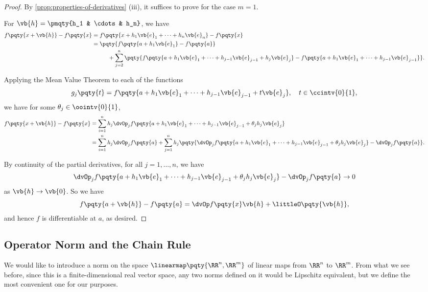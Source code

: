 \begin{proof}
    By \autoref{prop:properties-of-derivatives} (iii), it suffices to prove for the case \(m = 1\).

    For \(\vb{h} = \pmqty{h_1 & \cdots & h_n}\), we have
    \begin{align*}
        f\pqty{x + \vb{h}} - f\pqty{x} &= f\pqty{x + h_1 \vb{e}_1 + \cdots + h_n \vb{e}_n} - f\pqty{x} \\
        &= \pqty{f\pqty{a + h_1 \vb{e}_1} - f\pqty{a}} \\
        &\phantom{=} \qquad + \sum_{j = 2}^{n} \pqty{f\pqty{a + h_1 \vb{e}_1 + \cdots + h_{j - 1} \vb{e}_{j - 1} + h_j \vb{e}_j} - f\pqty{a + h_1 \vb{e}_1 + \cdots + h_{j - 1} \vb{e}_{j - 1}}}.
    \end{align*}

    Applying the Mean Value Theorem to each of the functions
    \[
        g_j\pqty{t} = f\pqty{a + h_1 \vb{e}_1 + \cdots + h_{j - 1} \vb{e}_{j - 1} + t \vb{e}_j}, \quad t \in \ccintv{0}{1},
    \]
    we have for some \(\theta_j \in \oointv{0}{1}\),
    \begin{align*}
        f\pqty{x + \vb{h}} - f\pqty{x} &= \sum_{i = 1}^{n} h_j \dvOp_j f\pqty{a + h_1 \vb{e}_1 + \cdots + h_{j - 1} \vb{e}_{j - 1} + \theta_j h_j \vb{e}_j} \\
        &= \sum_{i = 1}^{n} h_j \dvOp_j f\pqty{a} + \sum_{j = 1}^{n} h_j \pqty{\dvOp_j f\pqty{a + h_1 \vb{e}_1 + \cdots + h_{j - 1} \vb{e}_{j - 1} + \theta_j h_j \vb{e}_j} - \dvOp_j f\pqty{a}}.
    \end{align*}

    By continuity of the partial derivatives, for all \(j = 1, \ldots, n\), we have
    \[
        \dvOp_j f\pqty{a + h_1 \vb{e}_1 + \cdots + h_{j - 1} \vb{e}_{j - 1} + \theta_j h_j \vb{e}_j} - \dvOp_j f\pqty{a} \to 0
    \]
    as \(\vb{h} \to \vb{0}\). So we have
    \[
        f\pqty{a + \vb{h}} - f\pqty{a} = \dvOp f\pqty{x} \vb{h} + \littleO\pqty{\vb{h}},
    \]
    and hence \(f\) is differentiable at \(a\), as desired.
\end{proof}

\subsection{Operator Norm and the Chain Rule}

We would like to introduce a norm on the space \(\linearmap\pqty{\RR^n, \RR^m}\) of linear maps from \(\RR^n\) to \(\RR^m\). From what we see before, since this is a finite-dimensional real vector space, any two norms defined on it would be Lipschitz equivalent, but we define the most convenient one for our purposes.

